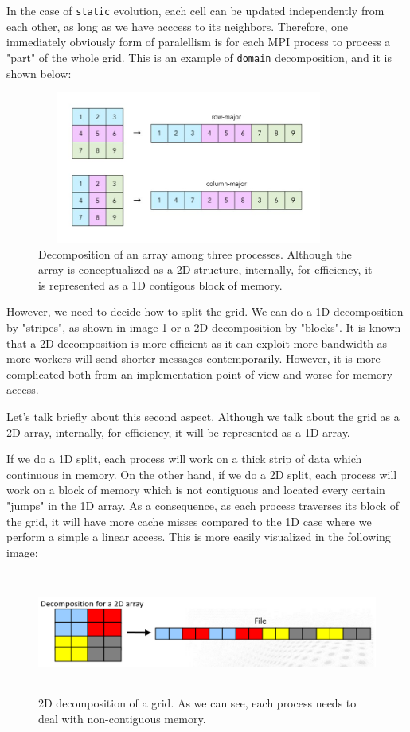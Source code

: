 \documentclass{report}
\begin{document}
In the case of \texttt{static} evolution, each cell can be updated 
independently from each other, as long as we have acccess to its neighbors. 
Therefore, one immediately obviously form of paralellism is for each MPI 
process to process a "part" of the whole grid. This is an example of \texttt{domain}
decomposition, and it is shown below:

\begin{figure}[H]
\centering
\includegraphics[width=10cm, height=5cm]{./other_images/arraydecomposition.jpg}
\caption{\label{fig:decomposition} Decomposition of an array among three processes. 
Although the array is conceptualized as a 2D structure, internally, for efficiency, 
it is represented as a 1D contigous block of memory.}
\end{figure}

However, we need to decide how to split the grid. We can do a 1D decomposition by 
"stripes", as shown in image \ref{fig:decomposition} or a 2D decomposition by 
"blocks". It is known that a 2D decomposition is more efficient as it 
can exploit more bandwidth as more workers will send shorter messages 
contemporarily. However, it is more complicated both from an implementation 
point of view and worse for memory access.

Let's talk briefly about this second aspect. Although we talk about the 
grid as a 2D array, internally, for efficiency, it will be represented as a 1D 
array. 

If we do a 1D split, each process will work on a thick strip of data which 
continuous in memory. On the other hand, if we do a 2D split, each process will 
work on a block of memory which is not contiguous and located every certain 
"jumps" in the 1D array. As a consequence, as each process traverses its block 
of the grid, it will have more cache misses compared to the 1D case where 
we perform a simple a linear access. This is more easily visualized in 
the following image:

\begin{figure}[H]
\centering
\includegraphics[width=12cm, height=4cm]{./other_images/2d_decomposition.png}
\caption{\label{fig:2ddecomposition} 2D decomposition of a grid. As we can see, 
each process needs to deal with non-contiguous memory.}
\end{figure}
\end{document}
